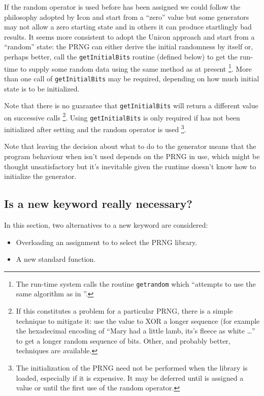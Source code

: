 \documentclass[letterpaper,12pt]{article}
\begin{document}
If the random operator is used before \rndkwd has been assigned we could
follow the philosophy adopted by Icon and start from a ``zero'' value but
some generators may not allow a zero starting state and in others it can
produce startlingly bad results. It seems more
consistent to adopt the Unicon approach and start from a ``random'' state:
the PRNG can either derive the initial randomness by itself or, perhaps
better, call the \texttt{getInitialBits} routine (defined below) to get the
run-time to supply some random data using the same method as at present%
\footnote{
  The run-time system calls the routine \texttt{getrandom} which ``attempts
  to use the same algorithm as in ''.
}.
More than one call of \texttt{getInitialBits} may be required, depending on
how much initial state is to be initialized.

Note that there is no guarantee that \texttt{getInitialBits} will return a
different value on successive calls%
\footnote{
  If this constitutes a problem for a particular PRNG, there is a simple
  technique to mitigate it: use the value to XOR a longer sequence (for
  example the hexadecimal encoding of ``Mary had a little lamb, its's
  fleece as white \ldots'' to get a longer random sequence of bits. Other,
  and probably better, techniques are available.
}.
Using \texttt{getInitialBits} is only required if \rndkwd has not been
initialized after setting \rndlibkwd and the random operator is used%
\footnote{
  The initialization of the PRNG need not be performed when the library is
  loaded, especially if it is expensive. It may be deferred until \rndkwd
  is assigned a value or until the first use of the random operator.
}.

Note that leaving the decision about what to do to the generator means
that the program behaviour when \rndkwd isn't used depends on the PRNG
in use, which might be thought unsatisfactory but it's inevitable given
the runtime doesn't know how to initialize the generator.


\subsection{Is a new keyword really necessary?}
In this section, two alternatives to a new keyword are considered:
\begin{itemize}
\item
  Overloading an assignment to \rndkwd to select the PRNG library.
\item
  A new standard function.
\end{itemize}
\end{document}
